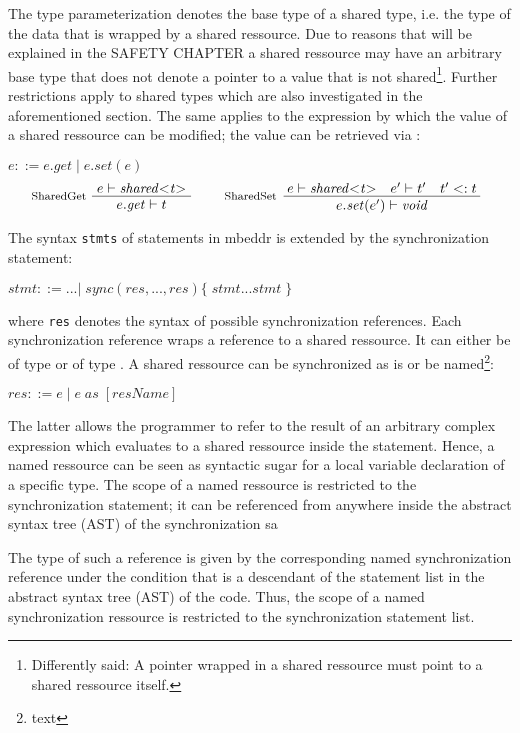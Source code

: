 The type parameterization denotes the base type of a shared type, i.e. the type of the data that is wrapped by a shared ressource. Due to reasons that will be explained in the SAFETY CHAPTER a shared ressource may have an arbitrary base type that does not denote a pointer to a value that is not shared\footnote{Differently said: A pointer wrapped in a shared ressource must point to a shared ressource itself.}. Further restrictions apply to shared types which are also investigated in the aforementioned section. The same applies to the  expression by which the value of a shared ressource can be modified; the value can be retrieved via :

$ e ::= e.\mathit{get}\;|\;e.\mathit{set(e)} $
\begin{align*}
\inference*[SharedGet]{e |- \mathit{shared{<}t{>}}} {\quad e.\mathit{get} |- t \quad}
\qquad
\inference*[SharedSet]{e |- \mathit{shared{<}t{>}} \quad e' |- t' \quad t' <: t} {\qquad\quad e.\mathit{set}(e') |- \mathit{void} \quad\qquad} 
\end{align*}

The syntax \texttt{stmts} of statements in mbeddr is extended by the synchronization statement:

$ \mathit{stmt} ::= ...
        |\;\mathit{sync}(res, ..., res) \{\;\mathit{stmt} ... \mathit{stmt}\;\}$
        
where \texttt{res} denotes the syntax of possible synchronization references. Each synchronization reference  wraps a reference to a shared ressource. It can either be of type  or of type . A shared ressource can be synchronized as is or be named\footnote{text}:

$ res ::= e\;|\;e\;\mathit{as}\;[\mathit{resName}] $

The latter allows the programmer to refer to the result of an arbitrary complex expression which evaluates to a shared ressource inside the  statement. Hence, a named ressource can be seen as syntactic sugar for a local variable declaration of a specific type. The scope of a named ressource is restricted to the synchronization statement; it can be referenced from anywhere inside the abstract syntax tree (AST) of the synchronization sa

The type of such a reference is given by the corresponding named synchronization reference under the condition that \CODE{[resName]} is a descendant of the statement list in the abstract syntax tree (AST) of the code. Thus, the scope of a named synchronization ressource is restricted to the synchronization statement list. 

